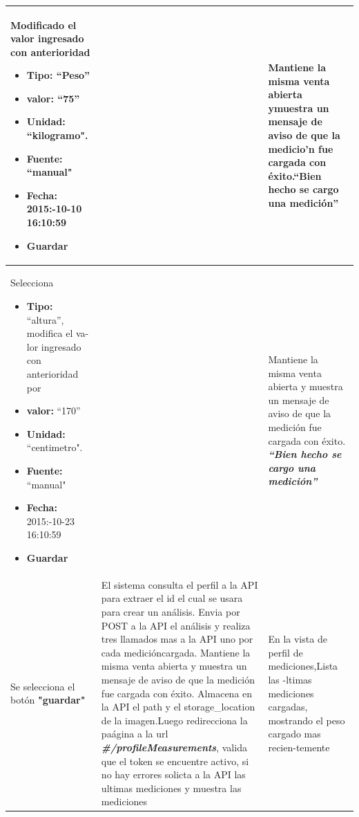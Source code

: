 \documentclass[a4paper,12pt]{article}
\begin{document}
\begin{longtable}{|p{5cm}|p{5cm}|p{5cm}|}
Modificado el valor ingresado con anterioridad

\begin{itemize}
	\item \textbf{Tipo:} ``Peso''
	\item \textbf{valor: }``75''
	\item \textbf{Unidad:} ``kilogramo".
	\item \textbf{Fuente: }``manual"
	\item \textbf{Fecha: }2015:-10-10 16:10:59
	\item \textbf{ Guardar}
\end{itemize}
&
& Mantiene la misma venta abierta ymuestra un mensaje de aviso de que la
medicio'n fue cargada con éxito.\textbf{``Bien hecho se cargo una medición''}
\\ \hline




Selecciona



\begin{itemize}
	\item \textbf{Tipo:} ``altura'', modifica el va-lor ingresado con anterioridad
	por
	\item \textbf{valor: }``170''
	\item \textbf{Unidad:} ``centimetro".
	\item \textbf{Fuente: }``manual"
	\item \textbf{Fecha: }2015:-10-23 16:10:59
	\item \textbf{ Guardar}
\end{itemize}
&
&
Mantiene la misma venta abierta y muestra un mensaje de aviso de que
la medición fue cargada con éxito.\textit{\textbf{ ``Bien hecho se cargo una medición''}}
\\ \hline




Se selecciona el botón \textbf{"guardar"}
& El sistema consulta el perfil a la API para extraer el id el cual se usara para crear un análisis. Envia por POST a la API el análisis y realiza tres llamados mas a la API uno por cada medicióncargada.
Mantiene la misma venta abierta y muestra un mensaje de aviso de que
la medición fue cargada con éxito. Almacena en la API el path y el storage\_location de la imagen.Luego redirecciona la paágina a la url
\textit{\textbf{\#/profileMeasurements}}, valida que el token se encuentre activo, si no hay
errores solicta a la API las ultimas mediciones y muestra las mediciones

& En la vista de perfil de mediciones,Lista las -ltimas mediciones cargadas,
mostrando el peso cargado mas recien-temente


\end{longtable}
\end{document}

